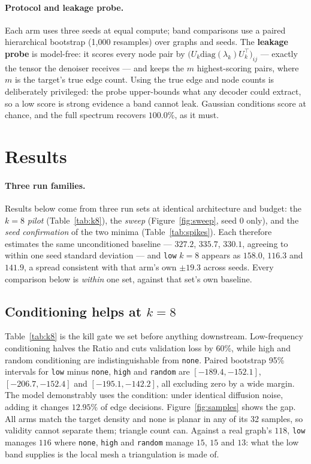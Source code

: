 \documentclass[11pt]{article}
\begin{document}
\paragraph{Protocol and leakage probe.} Each arm uses three seeds at equal compute; band
comparisons use a paired hierarchical bootstrap (1{,}000 resamples) over graphs and seeds. The
\textbf{leakage probe} is model-free: it scores every node pair by $\big(U_k
\mathrm{diag}(\lambda_k) U_k^\top\big)_{ij}$ --- exactly the tensor the denoiser receives --- and
keeps the $m$ highest-scoring pairs, where $m$ is the target's true edge count. Using the true edge and node counts is deliberately privileged: the probe upper-bounds what any
decoder could extract, so a low score is strong evidence a band cannot leak. Gaussian conditions score at chance, and the full spectrum recovers $100.0\%$, as it must.

\section{Results}
\label{sec:results}

\paragraph{Three run families.}
\label{sec:runfamilies}
Results below come from three run sets at identical architecture and budget: the $k{=}8$
\emph{pilot} (Table~\ref{tab:k8}), the \emph{sweep} (Figure~\ref{fig:sweep}, seed 0 only), and the
\emph{seed confirmation} of the two minima (Table~\ref{tab:spikes}). Each therefore estimates the
same unconditioned baseline --- $327.2$, $335.7$, $330.1$, agreeing to within one seed standard
deviation --- and \texttt{low} $k{=}8$ appears as $158.0$, $116.3$ and $141.9$, a spread
consistent with that arm's own $\pm19.3$ across seeds. Every comparison below is \emph{within} one
set, against that set's own baseline.

\subsection{Conditioning helps at $k{=}8$}
Table~\ref{tab:k8} is the kill gate we set before anything downstream. Low-frequency conditioning
halves the Ratio and cuts validation loss by 60\%, while high and random conditioning are
indistinguishable from \texttt{none}. Paired bootstrap 95\% intervals for
\texttt{low} minus \texttt{none}, \texttt{high} and \texttt{random} are $[-189.4, -152.1]$,
$[-206.7, -152.4]$ and $[-195.1, -142.2]$, all excluding zero by a wide margin. The model
demonstrably uses the condition: under identical diffusion noise, adding it changes $12.95\%$ of
edge decisions. Figure~\ref{fig:samples} shows the gap. All arms match the target density and none
is planar in any of its 32 samples, so validity cannot separate them; triangle count can. Against
a real graph's $118$, \texttt{low} manages $116$ where \texttt{none}, \texttt{high} and
\texttt{random} manage $15$, $15$ and $13$: what the low band supplies is the local mesh a
triangulation is made of.
\end{document}
